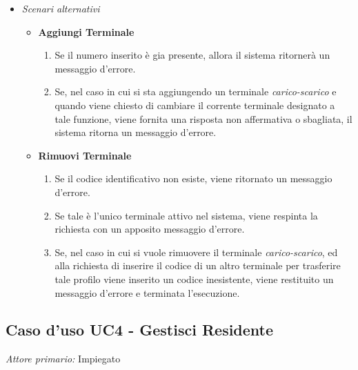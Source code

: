 \documentclass[12pt, letterpaper]{article}
\begin{document}
\begin{itemize}
    \item \emph{Scenari alternativi}
    \begin{itemize}
        \item \textbf{Aggiungi Terminale}
        \begin{enumerate}
            \item Se il numero inserito è gia 
            presente, allora il sistema ritornerà 
            un messaggio d'errore.
            \item Se, nel caso in cui si sta 
            aggiungendo un terminale 
            \emph{carico-scarico} e quando viene 
            chiesto di cambiare il corrente 
            terminale designato a tale funzione, 
            viene fornita una risposta non 
            affermativa o sbagliata, il sistema 
            ritorna un messaggio d'errore.
        \end{enumerate}
    \end{itemize}

    \begin{itemize}
        \item \textbf{Rimuovi Terminale}
        \begin{enumerate}
            \item Se il codice identificativo non 
            esiste, viene ritornato un messaggio 
            d'errore.
            \item Se tale è l'unico terminale 
            attivo nel sistema, viene respinta la 
            richiesta con un apposito messaggio 
            d'errore.
            \item Se, nel caso in cui si vuole 
            rimuovere il terminale 
            \emph{carico-scarico}, 
            ed alla richiesta di inserire il codice 
            di un altro terminale per trasferire 
            tale profilo viene inserito un codice 
            inesistente, viene restituito un 
            messaggio d'errore e terminata 
            l'esecuzione.
        \end{enumerate}
    \end{itemize}
\end{itemize}


\subsection{Caso d'uso UC4 - Gestisci Residente}

\emph{Attore primario: } Impiegato
\end{document}
